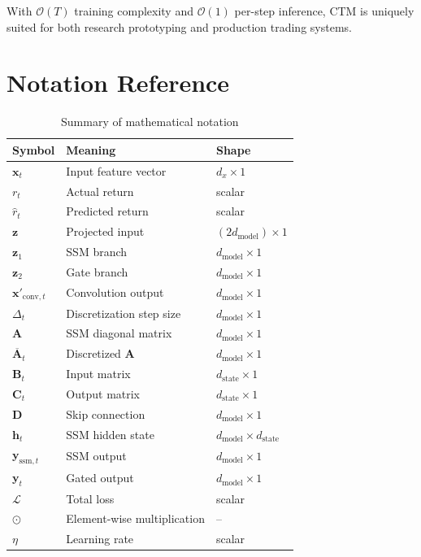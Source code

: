 \documentclass[11pt,a4paper]{article}
\newcommand{\loss}{\mathcal{L}}
\begin{document}
With $\mathcal{O}(T)$ training complexity and $\mathcal{O}(1)$ per-step
inference, CTM is uniquely suited for both research prototyping and
production trading systems.

\appendix
\section{Notation Reference}

\begin{table}[h]
\centering
\begin{tabular}{lll}
\toprule
Symbol & Meaning & Shape \\
\midrule
$\mathbf{x}_t$ & Input feature vector & $d_x \times 1$ \\
$r_t$ & Actual return & scalar \\
$\hat{r}_t$ & Predicted return & scalar \\
$\mathbf{z}$ & Projected input & $(2 d_{\text{model}}) \times 1$ \\
$\mathbf{z}_1$ & SSM branch & $d_{\text{model}} \times 1$ \\
$\mathbf{z}_2$ & Gate branch & $d_{\text{model}} \times 1$ \\
$\mathbf{x}'_{\text{conv},t}$ & Convolution output & $d_{\text{model}} \times 1$ \\
$\Delta_t$ & Discretization step size & $d_{\text{model}} \times 1$ \\
$\mathbf{A}$ & SSM diagonal matrix & $d_{\text{model}} \times 1$ \\
$\overline{\mathbf{A}}_t$ & Discretized $\mathbf{A}$ & $d_{\text{model}} \times 1$ \\
$\mathbf{B}_t$ & Input matrix & $d_{\text{state}} \times 1$ \\
$\mathbf{C}_t$ & Output matrix & $d_{\text{state}} \times 1$ \\
$\mathbf{D}$ & Skip connection & $d_{\text{model}} \times 1$ \\
$\mathbf{h}_t$ & SSM hidden state & $d_{\text{model}} \times d_{\text{state}}$ \\
$\mathbf{y}_{\text{ssm},t}$ & SSM output & $d_{\text{model}} \times 1$ \\
$\mathbf{y}_t$ & Gated output & $d_{\text{model}} \times 1$ \\
$\loss$ & Total loss & scalar \\
$\odot$ & Element-wise multiplication & -- \\
$\eta$ & Learning rate & scalar \\
\bottomrule
\end{tabular}
\caption{Summary of mathematical notation}
\label{tab:notation}
\end{table}
\end{document}
